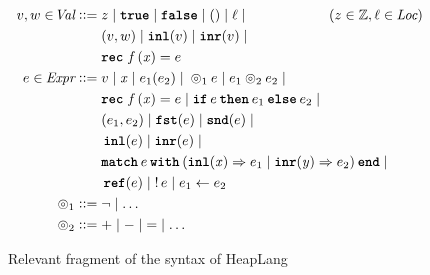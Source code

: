 \documentclass[thesis.tex]{subfiles}
\begin{document}
\begin{figure}[t]
    \begin{center}
        \begin{align*}
            \val,\valB \in \Val \bnfdef{} &
            z \mid
            \True \mid \False \mid
            \TT \mid
            \loc \mid                     \hspace*{2cm} (z \in \integer, \loc \in \Loc) \\ &
            (\val,\valB) \mid
            \Inl(\val) \mid
            \Inr(\val) \mid                                                             \\ &
            \Rec\lvarF\,(\lvar)= \expr                                                  \\
            \expr \in \Expr \bnfdef{}     &
            \val \mid
            \lvar \mid
            \expr_1(\expr_2) \mid
            {}
            \HLOp_1 \expr \mid
            \expr_1 \HLOp_2 \expr_2 \mid                                                \\ &
            \Rec\lvarF\,(\lvar)= \expr \mid
            \If \expr then \expr_1 \Else \expr_2 \mid
            {}                                                                          \\ &
            (\expr_1,\expr_2) \mid
            \Fst(\expr) \mid
            \Snd(\expr) \mid
            {}                                                                          \\ &
            \Inl(\expr) \mid
            \Inr(\expr) \mid                                                            \\ &
            \Match \expr with (\Inl(\lvar) => \expr_1 | \Inr(\lvarB) => \expr_2) end \mid
            {}                                                                          \\ &
            \Alloc(\expr) \mid
            \deref \expr \mid
            \expr_1 \gets \expr_2                                                       \\
            \HLOp_1 \bnfdef{}             & \lnot \mid \ldots                           \\
            \HLOp_2 \bnfdef{}             & + \mid - \mid \mathop{=} \mid \ldots
        \end{align*}
        \caption{Relevant fragment of the syntax of HeapLang}
        \label{fig:heaplangsyntax}
    \end{center}
\end{figure}
\end{document}
